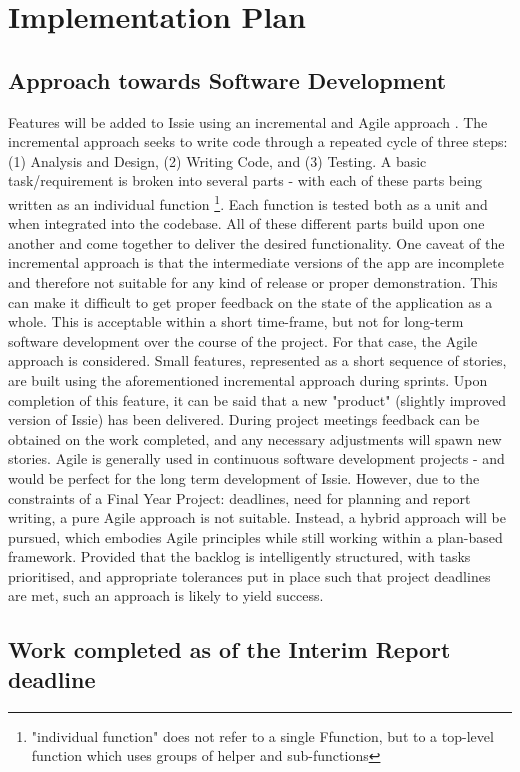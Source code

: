 \chapter{Implementation Plan}
\section{Approach towards Software Development}
Features will be added to Issie using an incremental and Agile approach \cite{Voorhees2020}.
The incremental approach seeks to write code through a repeated cycle of three steps: (1) Analysis and Design, (2) Writing Code, and (3) Testing. A basic task/requirement is  broken into several parts - with each of these parts being written as an individual function \footnote{"individual function" does not refer to a single F\fsharp function, but to a top-level function which uses groups of helper and sub-functions}. Each function is tested both as a unit and when integrated into the codebase. All of these different parts build upon one another and come together to deliver the desired functionality. One caveat of the incremental approach is that the intermediate versions of the app are incomplete and therefore not suitable for any kind of release or proper demonstration. This can make it difficult to get proper feedback on the state of the application as a whole. This is acceptable within a short time-frame, but not for long-term software development over the course of the project. For that case, the Agile approach is considered. Small features, represented as a short sequence of stories, are built using the aforementioned incremental approach during sprints. Upon completion of this feature, it can be said that a new "product" (slightly improved version of Issie) has been delivered. During project meetings feedback can be obtained on the work completed, and any necessary adjustments will spawn new stories. Agile is generally used in continuous software development projects - and would be perfect for the long term development of Issie. However, due to the constraints of a Final Year Project: deadlines, need for planning and report writing, a pure Agile approach is not suitable. Instead, a hybrid approach will be pursued, which embodies Agile principles while still working within a plan-based framework. Provided that the backlog is intelligently structured, with tasks prioritised, and appropriate tolerances put in place such that project deadlines are met, such an approach is likely to yield success.

\section{Work completed as of the Interim Report deadline}

